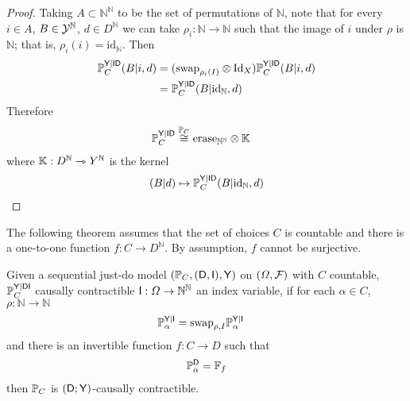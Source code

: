 \begin{proof}
Taking $A\subset \mathbb{N}^{\mathbb{N}}$ to be the set of permutations of $\mathbb{N}$, note that for every $i\in A$, $B\in\mathcal{Y}^{\mathbb{N}}$, $d\in D^{\mathbb{N}}$ we can take $\rho_i:\mathbb{N}\to \mathbb{N}$ such that the image of $i$ under $\rho$ is $\mathbb{N}$; that is, $\rho_i(i)=\text{id}_{\mathbb{N}}$. Then
\begin{align}
    \mathbb{P}_C^{\mathsf{Y}|\mathsf{ID}}(B|i,d) &= (\text{swap}_{\rho_i(I)}\otimes \text{Id}_X )\mathbb{P}_C^{\mathsf{Y}|\mathsf{ID}}(B|i,d)\\
    &= \mathbb{P}_C^{\mathsf{Y}|\mathsf{ID}}(B|\text{id}_{\mathbb{N}},d)
\end{align}
Therefore
\begin{align}
    \mathbb{P}_C^{\mathsf{Y}|\mathsf{ID}} &\overset{\mathbb{P}_C}{\cong} \text{erase}_{\mathbb{N}^{\mathbb{N}}}\otimes \mathbb{K} 
\end{align}
where $\mathbb{K}:D^{\mathbb{N}}\rightarrowtriangle Y^{\mathbb{N}}$ is the kernel
\begin{align}
    (B|d)\mapsto \mathbb{P}_C^{\mathsf{Y}|\mathsf{ID}}(B|\text{id}_{\mathbb{N}},d)
\end{align}
\end{proof}

The following theorem assumes that the set of choices $C$ is countable and there is a one-to-one function $f:C\to D^{\mathbb{N}}$. By assumption, $f$ cannot be surjective.

\begin{theorem}\label{th:cc_ind_treat}
Given a sequential just-do model $(\mathbb{P}_C,(\mathsf{D},\mathsf{I}),\mathsf{Y})$ on $(\Omega,\mathcal{F})$ with $C$ countable, $\mathbb{P}_C^{\mathsf{Y}|\mathsf{DI}}$ causally contractible $\mathsf{I}:\Omega\to \mathbb{N}^{\mathbb{N}}$ an index variable, if for each $\alpha\in C$, $\rho:\mathbb{N}\to \mathbb{N}$
\begin{align}
    \mathbb{P}_\alpha^{\mathsf{Y}|\mathsf{I}} &= \text{swap}_{\rho,I}\mathbb{P}_\alpha^{\mathsf{Y}|\mathsf{I}}
\end{align}
and there is an invertible function $f:C\to D$ such that
\begin{align}
    \mathbb{P}_\alpha^{\mathsf{D}} = \mathbb{F}_f
\end{align}
then $\mathbb{P}_C$ is $(\mathsf{D};\mathsf{Y})$-causally contractible.
\end{theorem}

